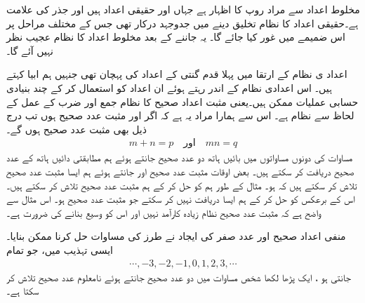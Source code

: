 مخلوط اعداد سے مراد   روپ کا اظہار ہے جہاں  اور  حقیقی اعداد ہیں اور  جذر  کی علامت ہے۔حقیقی اعداد کا نظام تخلیق دینے میں  جدوجہد درکار تھی جس  کے مختلف مراحل پر   اس ضمیمے میں غور کیا جائے گا۔ یہ جاننے کے بعد مخلوط اعداد کا نظام عجیب نظر  نہیں آئے گا۔

اعداد ی نظام  کے ارتقا میں پہلا قدم گنتی کے اعداد  کی پہچان تھی جنہیں ہم ابیا  کہتے ہیں۔ اس اعدادی نظام کے اندر رہتے ہوئے ان اعداد کو استعمال کر کے چند بنیادی  حسابی  عملیات ممکن ہیں۔یعنی مثبت اعداد صحیح کا نظام جمع اور ضرب کے عمل  کے لحاظ سے نظام ہے۔ اس سے ہمارا مراد یہ ہے کہ اگر  اور  مثبت عدد صحیح ہوں تب  درج ذیل بھی مثبت عدد  صحیح   ہوں گے۔
\begin{align}\label{مساوات_ج_عدد_صحیح_بند_الف}
m+n=p\quad  \text{اور}\quad mn=q  
\end{align}
مساوات  کی دونوں مساواتوں  میں بائیں ہاتھ دو عدد صحیح جانتے ہوئے ہم مطابقتی دائیں ہاتھ کے  عدد صحیح دریافت کر سکتے ہیں۔ بعض اوقات  مثبت عدد صحیح  اور  جانتے ہوئے ہم  ایسا مثبت عدد صحیح  تلاش کر سکتے ہیں کہ  ہو۔ مثال کے طور ہم   کو حل کر کے  ہم  مثبت عدد صحیح   تلاش کر سکتے ہیں۔ اس کے برعکس    کو حل کر کے ہم ایسا  دریافت نہیں کر سکتے جو مثبت عدد صحیح  ہو۔ اس مثال سے واضح ہے کہ مثبت عدد صحیح نظام زیادہ کارآمد نہیں اور اس کو وسیع بنانے کی ضرورت ہے۔

منفی اعداد صحیح اور   عدد صفر کی ایجاد نے   طرز کی مساوات حل کرنا ممکن بنایا۔  ایسی تہذیب میں، جو تمام
\begin{align}\label{مساوات_ضمیمہ_ج_عدد_صحیح}
\cdots,-3,-2,-1,0,1,2,3,\cdots
\end{align}
 جانتی ہو ، ایک پڑھا لکھا شخص  مساوات  میں دو عدد صحیح جانتے ہوئے  نامعلوم عدد صحیح تلاش کر سکتا ہے۔

